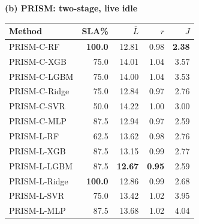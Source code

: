\begin{minipage}[t]{.485\textwidth}\centering\textbf{(b) PRISM: two-stage, live idle}\par\smallskip
\begin{tabular*}{\linewidth}{@{\extracolsep{\fill}}lrrrr@{}}
\toprule
\mbox{Method} & \mbox{SLA\%} & \mbox{$\bar L$} & \mbox{$r$} & \mbox{$J$}\\\midrule
PRISM-C-RF & \textbf{100.0} & 12.81 & 0.98 & \textbf{2.38}\\
PRISM-C-XGB & 75.0 & 14.01 & 1.04 & 3.57\\
PRISM-C-LGBM & 75.0 & 14.00 & 1.04 & 3.53\\
PRISM-C-Ridge & 75.0 & 12.84 & 0.97 & 2.76\\
PRISM-C-SVR & 50.0 & 14.22 & 1.00 & 3.00\\
PRISM-C-MLP & 87.5 & 12.94 & 0.97 & 2.59\\
PRISM-L-RF & 62.5 & 13.62 & 0.98 & 2.76\\
PRISM-L-XGB & 87.5 & 13.15 & 0.99 & 2.77\\
PRISM-L-LGBM & 87.5 & \textbf{12.67} & \textbf{0.95} & 2.59\\
PRISM-L-Ridge & \textbf{100.0} & 12.86 & 0.99 & 2.68\\
PRISM-L-SVR & 75.0 & 13.42 & 1.02 & 3.95\\
PRISM-L-MLP & 87.5 & 13.68 & 1.02 & 4.04\\
\bottomrule\end{tabular*}\end{minipage}
